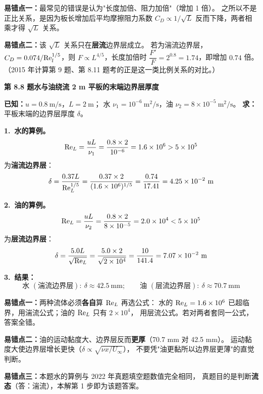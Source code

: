 \begin{yicuo}
\textbf{易错点一：}最常见的错误是认为"长度加倍、阻力加倍"（增加 1 倍）。
之所以不是正比关系，是因为板长增加后平均摩擦阻力系数
$C_D\propto1/\sqrt{L}$ 反而下降，两者相乘才得 $\sqrt{L}$ 关系。

\textbf{易错点二：}该 $\sqrt{L}$ 关系只在\textbf{层流}边界层成立。
若为湍流边界层，$C_D=0.074/\mathrm{Re}_l^{1/5}$，则
$F\propto L^{4/5}$，长度加倍时 $\dfrac{F'}{F}=2^{0.8}=1.74$，即增加 $0.74$ 倍。
（2015 年计算第 9 题、第 8.11 题考的正是这一类比例关系的对比。）
\end{yicuo}

\noindent\textbf{第 8.8 题\quad 水与油绕流 2 m 平板的末端边界层厚度}

\begin{jie}
\textbf{已知：}$u=0.8\ \mathrm{m/s}$，$L=2\ \mathrm{m}$；
水 $\nu_1=10^{-6}\ \mathrm{m^2/s}$，油 $\nu_2=8\times10^{-5}\ \mathrm{m^2/s}$。
\textbf{求：}平板末端的边界层厚度 $\delta$。

\textbf{1.\ 水的算例。}
\[
\mathrm{Re}_L=\frac{uL}{\nu_1}=\frac{0.8\times2}{10^{-6}}=1.6\times10^6>5\times10^5
\]
为\textbf{湍流边界层}：
\[
\delta=\frac{0.37L}{\Rey_L^{1/5}}
=\frac{0.37\times2}{(1.6\times10^6)^{1/5}}=\frac{0.74}{17.41}=4.25\times10^{-2}\ \mathrm{m}
\]

\textbf{2.\ 油的算例。}
\[
\mathrm{Re}_L=\frac{uL}{\nu_2}=\frac{0.8\times2}{8\times10^{-5}}=2.0\times10^4<5\times10^5
\]
为\textbf{层流边界层}：
\[
\delta=\frac{5.0L}{\sqrt{\Rey_L}}=\frac{5.0\times2}{\sqrt{2\times10^4}}=\frac{10}{141.4}=7.07\times10^{-2}\ \mathrm{m}
\]

\textbf{3.\ 结果：}
\[
\boxed{\,\text{水 }(\text{湍流边界层}):\ \delta\approx42.5\ \mathrm{mm};\qquad
\text{油 }(\text{层流边界层}):\ \delta\approx70.7\ \mathrm{mm}\,}
\]
\end{jie}

\begin{yicuo}
\textbf{易错点一：}两种流体必须\textbf{各自}算 $\mathrm{Re}_L$ 再选公式：
水的 $\mathrm{Re}_L=1.6\times10^6$ 已超临界，用湍流公式；油的 $\mathrm{Re}_L$ 只有 $2\times10^4$，
用层流公式。若对两者套同一公式，答案全错。

\textbf{易错点二：}油的运动黏度大、边界层反而\textbf{更厚}（70.7 mm 对 42.5 mm）。
运动黏度大使边界层增长更快（$\delta\propto\sqrt{\nu x/U_\infty}$），
不要凭"油更黏所以边界层更薄"的直觉判断。

\textbf{易错点三：}本题水的算例与 2022 年真题填空题数值完全相同，
真题目的是判断\textbf{流态}（答：湍流），本解第 1 步即为该题答案。
\end{yicuo}


